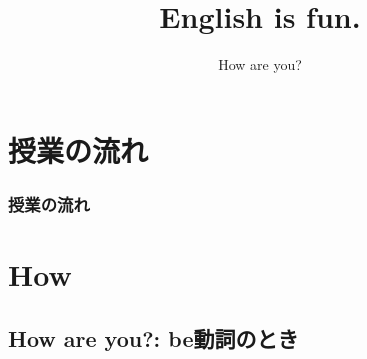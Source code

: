 \documentclass[aspectratio=169,xcolor={dvipsnames,table}]{beamer}
\title{English is fun.}
\subtitle{How are you?}
\author{}
\institute[]{}
\date[]
\begin{document}
\begin{frame}[plain]
  \titlepage
\end{frame}

\section*{授業の流れ}
\begin{frame}[plain]
  \frametitle{授業の流れ}
  \tableofcontents
\end{frame}

\section{How}
\subsection{How are you?: be動詞のとき}
\end{document}
